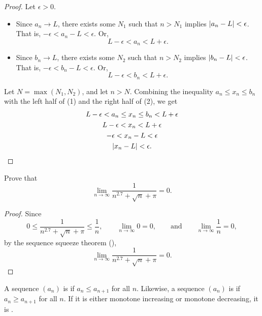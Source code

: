 \begin{proof}
  Let $\epsilon > 0$.
  \begin{itemize}
    \item Since $a_n \to L$, there exists some $N_1$ such that $n >
      N_1$ implies $| a_n - L | < \epsilon$. That is, $-\epsilon <
      a_n - L < \epsilon$. Or,
      \[ L - \epsilon < a_n < L + \epsilon. \tag{1} \]

    \item Since $b_n \to L$, there exists some $N_2$ such that $n >
      N_2$ implies $| b_n - L | < \epsilon$. That is, $-\epsilon <
      b_n - L < \epsilon$. Or,
      \[ L - \epsilon < b_n < L + \epsilon. \tag{2} \]
  \end{itemize}

  Let $N = \max(N_1, N_2)$, and let $n > N$. Combining the
  inequality $a_n \leq x_n \leq b_n$ with the left half of (1) and
  the right half of (2), we get
  \begin{gather*}
    L - \epsilon < a_n \leq x_n \leq b_n < L + \epsilon \\
    L - \epsilon < x_n < L + \epsilon \\
    -\epsilon < x_n - L < \epsilon \\
    | x_n - L | < \epsilon.
  \end{gather*}
  \vspace{-1em}
\end{proof}

\begin{example}
  Prove that
  \[ \lim_{n \to \infty} \frac{1}{n^{2.7} + \sqrt{n} + \pi} = 0. \]

  \begin{proof}
    Since
    \[ 0 \leq \frac{1}{n^{2.7} + \sqrt{n} + \pi} \leq \frac{1}{n},
      \qquad \lim_{n \to \infty} 0 = 0, \qquad \text{and} \qquad \lim_{n
    \to \infty} \frac{1}{n} = 0, \]
    by the sequence squeeze theorem (),
    \[ \lim_{n \to \infty} \frac{1}{n^{2.7} + \sqrt{n} + \pi} = 0. \]
  \end{proof}
\end{example}

\begin{definition}
  A sequence $(a_n)$ is  if $a_n \leq a_{n
  + 1}$ for all $n$. Likewise, a sequence $(a_n)$ is  if $a_n \geq a_{n + 1}$ for all $n$. If it is either
  monotone increasing or monotone decreasing, it is .
\end{definition}

